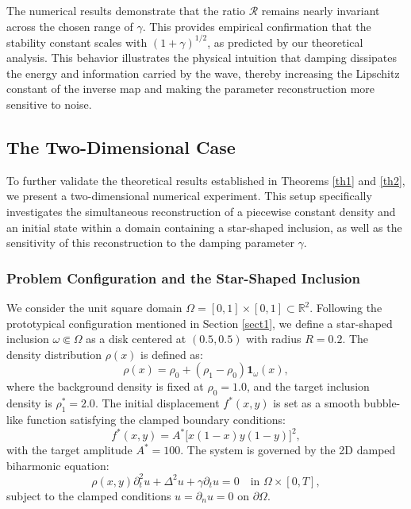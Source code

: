 \documentclass[12pt,reqno]{amsart}
\numberwithin{equation}{section}
\begin{document}
	The numerical results demonstrate that the ratio $\mathcal{R}$ remains nearly invariant across the chosen range of $\gamma$. This provides empirical confirmation that the stability constant scales with $(1+\gamma)^{1/2}$, as predicted by our theoretical analysis. This behavior illustrates the physical intuition that damping dissipates the energy and information carried by the wave, thereby increasing the Lipschitz constant of the inverse map and making the parameter reconstruction more sensitive to noise.
	
	
	\subsection{The Two-Dimensional Case}
	
	To further validate the theoretical results established in Theorems \ref{th1} and \ref{th2}, we present a two-dimensional numerical experiment. This setup specifically investigates the simultaneous reconstruction of a piecewise constant density and an initial state within a domain containing a star-shaped inclusion, as well as the sensitivity of this reconstruction to the damping parameter $\gamma$.
	
	\subsubsection{Problem Configuration and the Star-Shaped Inclusion}
	We consider the unit square domain $\Omega = [0, 1] \times [0, 1] \subset \mathbb{R}^2$. Following the prototypical configuration mentioned in Section \ref{sect1}, we define a star-shaped inclusion $\omega \Subset \Omega$ as a disk centered at $(0.5, 0.5)$ with radius $R = 0.2$. The density distribution $\rho(x)$ is defined as:
	\begin{equation}
		\rho(x) = \rho_0 + (\rho_1 - \rho_0) \mathbf{1}_{\omega}(x),
	\end{equation}
	where the background density is fixed at $\rho_0 = 1.0$, and the target inclusion density is $\rho_1^* = 2.0$. The initial displacement $f^*(x, y)$ is set as a smooth bubble-like function satisfying the clamped boundary conditions:
	\begin{equation}
		f^*(x, y) = A^* \big[x(1-x)y(1-y)\big]^2,
	\end{equation}
	with the target amplitude $A^* = 100$. The system is governed by the 2D damped biharmonic equation:
	\begin{equation}
		\rho(x, y) \partial_t^2 u + \Delta^2 u + \gamma \partial_t u = 0 \quad \text{in } \Omega \times [0, T],
	\end{equation}
	subject to the clamped conditions $u = \partial_n u = 0$ on $\partial \Omega$.
	
\end{document}

